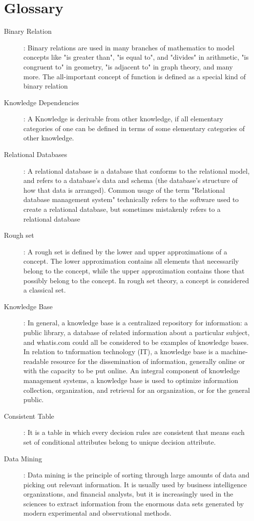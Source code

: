 \documentclass[12pt]{article}
\begin{document}
\section*{Glossary}
\begin{description}
\item [Binary Relation]: Binary relations are used in many branches of mathematics to model concepts like "is greater than", "is equal to", and "divides" in arithmetic, "is congruent to" in geometry, "is adjacent to" in graph theory, and many more. The all-important concept of function is defined as a special kind of binary relation
\item [Knowledge Dependencies]: A Knowledge is derivable from other knowledge, if all elementary categories of one  can be defined in terms of some elementary categories of other knowledge.
\item [Relational Databases]: A relational database is a database that conforms to the relational model, and refers to a database's data and schema (the database's structure of how that data is arranged). Common usage of the term "Relational database management system" technically refers to the software used to create a relational database, but sometimes mistakenly refers to a relational database
\item [Rough set]: A rough set is defined by the lower
and upper approximations of a concept. The lower approximation
contains all elements that necessarily belong to the concept, while
the upper approximation contains those that possibly belong  to the
concept. In rough set theory, a concept is considered a classical
set.
\item [Knowledge Base]: In general, a knowledge base is a centralized repository for information: a public library, a database of related information about a particular subject, and whatis.com could all be considered to be examples of knowledge bases. In relation to tnformation technology (IT), a knowledge base is a machine-readable resource for the dissemination of information, generally online or with the capacity to be put online. An integral component of knowledge management systems, a knowledge base is used to optimize information collection, organization, and retrieval for an organization, or for the general public.
\item [Consistent Table]: It is a table in which every decision rules are consistent that means each set of conditional attributes belong to unique decision attribute.
\item [Data Mining]: Data mining is the principle of sorting through large amounts of data and picking out relevant information. It is usually used by business intelligence organizations, and financial analysts, but it is increasingly used in the sciences to extract information from the enormous data sets generated by modern experimental and observational methods.

\end{description}
\end{document}
